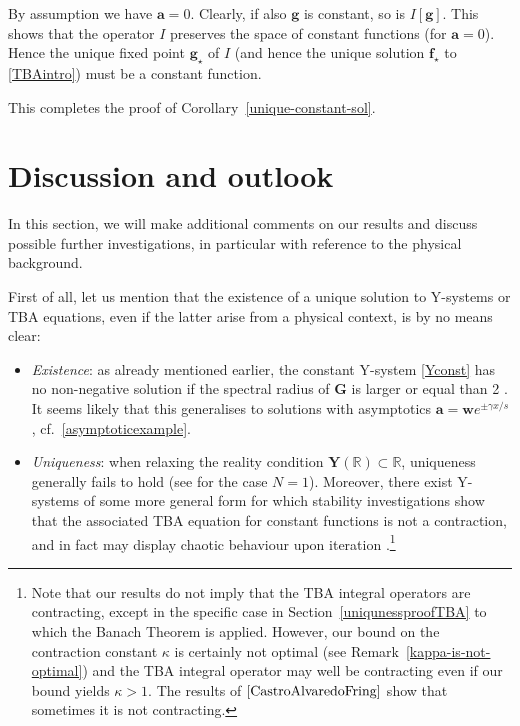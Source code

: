 \documentclass[12pt]{article}
\theoremstyle{plain}
\theoremstyle{definition}
\numberwithin{equation}{section}
\numberwithin{theorem}{section}
\renewcommand{\vec}[1]{\mathbf{#1}}
\begin{document}
By assumption we have $\vec a = 0$. Clearly, if also $\vec g$ is constant, so is $I[\vec g]$. 
This shows that the operator $I$ preserves the space of constant functions (for $\vec a=0$). Hence the unique fixed point $\vec g_\star$ of $I$ (and hence the unique solution $\vec f_\star$ to \eqref{TBAintro}) must be a constant function. 

This completes the proof of Corollary~\ref{unique-constant-sol}.


\section{Discussion and outlook}\label{section-outlook}

In this section, we will make additional
comments on our results and discuss possible further investigations, in particular with reference to the physical background.



\medskip

First of all, let us mention that the existence of a unique solution to Y-systems or TBA equations, even if the latter arise from a physical context, is by no means clear:
\begin{itemize}
\item \emph{Existence}: as already mentioned earlier, the constant Y-system \eqref{Yconst} has no non-negative solution if the spectral radius of $\vec G$ is larger or equal than 2 \cite{Tateo:DynkinTBAs}. 
It seems likely that this generalises to solutions with asymptotics $\vec{a} = \vec{w}e^{\pm\gamma x/s}$, cf.\ \eqref{asymptoticexample}.
\item \emph{Uniqueness}: when relaxing the reality condition $\vec{Y}(\mathbb{R})\subset\mathbb{R}$, uniqueness generally fails to hold (see \cite[Fig.\,1]{DoreyTateo:YL} for the case $N=1$). 
Moreover, there exist Y-systems of some more general form for which stability investigations show that the associated TBA equation for constant functions is not a contraction,
and in fact may display chaotic behaviour upon iteration \cite{CastroAlvaredoFring}.\footnote{Note that our results do not imply that the TBA integral operators are contracting, except in the specific case in Section~\ref{uniqunessproofTBA} to which the Banach Theorem is applied. However, our bound on the contraction constant $\kappa$ is certainly not optimal (see Remark~\ref{kappa-is-not-optimal}) and the TBA integral operator may well be contracting even if our bound yields $\kappa>1$. The results of $\cite{CastroAlvaredoFring}$ show that sometimes it is not contracting.}
\end{itemize}
\end{document}
